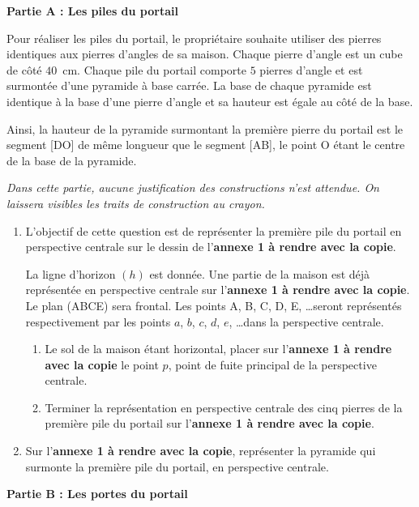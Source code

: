 \documentclass[10pt]{article}
\begin{document}
\textbf{Partie A : Les piles du portail}

\medskip 

Pour réaliser les piles du portail, le propriétaire souhaite utiliser des pierres identiques aux pierres d'angles de sa maison. Chaque pierre d'angle est un cube de côté $40$~cm. Chaque pile du portail comporte $5$ pierres d'angle et est surmontée d'une pyramide à base carrée. La base de chaque pyramide est identique à la base d'une pierre d'angle et sa hauteur est égale au côté de la base. 

Ainsi, la hauteur de la pyramide surmontant la première pierre du portail est le segment [DO] de même longueur que le segment [AB], le point O étant le centre de la base de la pyramide. 

\emph{Dans cette partie, aucune justification des constructions n'est attendue. On laissera visibles les traits de construction au crayon.}

\medskip 

\begin{enumerate}
\item L'objectif de cette question est de représenter la première pile du portail en perspective centrale sur le dessin de l'\textbf{annexe 1 à rendre avec la copie}. 

La ligne d'horizon $(h)$ est donnée. Une partie de la maison est déjà représentée en perspective centrale sur l'\textbf{annexe 1 à rendre avec la copie}. Le plan (ABCE) sera frontal. Les points A, B, C, D, E, \ldots seront représentés respectivement par les points $a$, $b$, $c$, $d$, $e$, \ldots dans la perspective centrale. 
	\begin{enumerate}
		\item Le sol de la maison étant horizontal, placer sur l'\textbf{annexe 1 à rendre avec la copie} le point $p$, point de fuite principal de la perspective centrale. 
		\item Terminer la représentation en perspective centrale des cinq pierres de la première pile du portail sur l'\textbf{annexe 1 à rendre avec la copie}. 
	\end{enumerate}
\item  Sur l'\textbf{annexe 1 à rendre avec la copie}, représenter la pyramide qui surmonte la première pile du portail, en perspective centrale. 
\end{enumerate}

\bigskip

\textbf{Partie B : Les portes du portail}
\end{document}
